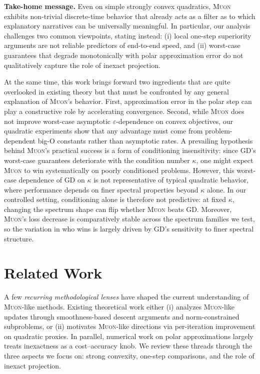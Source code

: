 \documentclass{article}
\theoremstyle{plain}
\theoremstyle{definition}
\theoremstyle{remark}
\newcommand{\GD}{\textsc{GD}}
\newcommand{\Muon}{\textsc{Muon}}
\newcommand{\eps}{\varepsilon}
\begin{document}
\textbf{Take-home message.}
Even on simple strongly convex quadratics, \Muon{} exhibits
non-trivial discrete-time behavior that already acts as a filter as to 
which explanatory narratives can be universally meaningful. 
In particular, our analysis challenges two common viewpoints, stating instead:
(i) local one-step superiority arguments are not reliable predictors of
end-to-end speed, and
(ii) worst-case guarantees that degrade monotonically with polar approximation
error 
do not qualitatively capture the role of inexact projection. 

At the same time, this work brings forward two ingredients that are 
quite overlooked in existing theory but 
that must be confronted by any general explanation of \Muon{}'s behavior. 
First, approximation error in the polar step can play a constructive
role by accelerating convergence. 
Second, while \Muon{} does not improve worst-case 
asymptotic $\eps$-dependence on 
convex objectives, our quadratic experiments show that 
any advantage must come from problem-dependent big-O constants rather than asymptotic rates. 
A prevailing hypothesis behind \Muon{}'s practical success is a form of conditioning insensitivity: 
since \GD{}'s worst-case guarantees deteriorate with the condition number $\kappa$, 
one might expect \Muon{} to win systematically on poorly conditioned problems. 
However, this worst-case dependence of \GD{} on $\kappa$ is not representative of typical quadratic behavior, 
where performance depends on finer spectral properties beyond $\kappa$ alone. 
In our controlled setting, conditioning alone is therefore not predictive: 
at fixed $\kappa$, changing the spectrum shape can flip whether \Muon{} beats \GD{}. 
Moreover, \Muon{}'s loss decrease is comparatively stable across the spectrum families we test, 
so the variation in who wins is largely driven by \GD{}'s sensitivity to finer spectral structure.

\section{Related Work}
\label{sec:related-work} 

A few \emph{recurring methodological lenses} have shaped 
the current understanding of \Muon{}-like methods. 
Existing theoretical work 
either 
(i) analyzes \Muon{}-like updates through smoothness-based descent arguments and norm-constrained subproblems, or
(ii) motivates \Muon{}-like directions via per-iteration improvement on quadratic proxies.
In parallel, numerical work on polar approximations largely treats inexactness as a cost--accuracy knob.
We review these threads through the three aspects we focus on: 
strong convexity, one-step comparisons, and the role of inexact projection.
\end{document}
